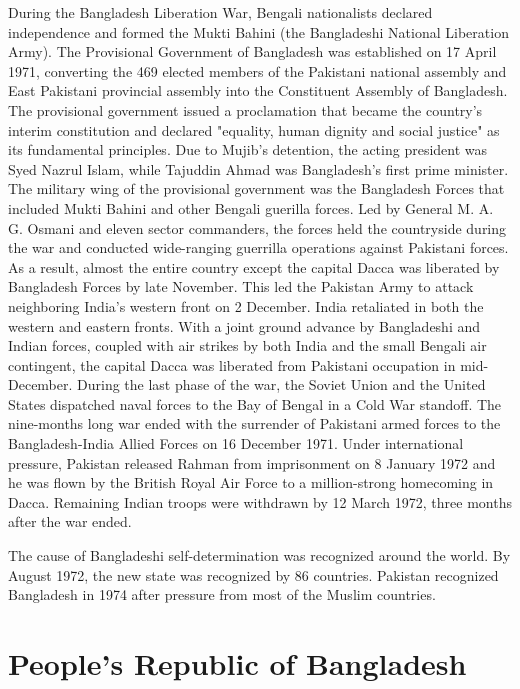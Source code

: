 During the Bangladesh Liberation War, Bengali nationalists declared
independence and formed the Mukti Bahini (the Bangladeshi National
Liberation Army). The Provisional Government of Bangladesh was
established on 17 April 1971, converting the 469 elected members of the
Pakistani national assembly and East Pakistani provincial assembly into
the Constituent Assembly of Bangladesh. The provisional government
issued a proclamation that became the country's interim constitution and
declared "equality, human dignity and social justice" as its fundamental
principles. Due to Mujib's detention, the acting president was Syed
Nazrul Islam, while Tajuddin Ahmad was Bangladesh's first prime
minister. The military wing of the provisional government was the
Bangladesh Forces that included Mukti Bahini and other Bengali guerilla
forces. Led by General M. A. G. Osmani and eleven sector commanders, the
forces held the countryside during the war and conducted wide-ranging
guerrilla operations against Pakistani forces. As a result, almost the
entire country except the capital Dacca was liberated by Bangladesh
Forces by late November. This led the Pakistan Army to attack
neighboring India's western front on 2 December. India retaliated in
both the western and eastern fronts. With a joint ground advance by
Bangladeshi and Indian forces, coupled with air strikes by both India
and the small Bengali air contingent, the capital Dacca was liberated
from Pakistani occupation in mid-December. During the last phase of the
war, the Soviet Union and the United States dispatched naval forces to
the Bay of Bengal in a Cold War standoff. The nine-months long war ended
with the surrender of Pakistani armed forces to the Bangladesh-India
Allied Forces on 16 December 1971. Under international pressure,
Pakistan released Rahman from imprisonment on 8 January 1972 and he was
flown by the British Royal Air Force to a million-strong homecoming in
Dacca. Remaining Indian troops were withdrawn by 12 March 1972, three
months after the war ended.

The cause of Bangladeshi self-determination was recognized around the
world. By August 1972, the new state was recognized by 86 countries.
Pakistan recognized Bangladesh in 1974 after pressure from most of the
Muslim countries.

\section{People's Republic of
Bangladesh}\label{peoples-republic-of-bangladesh}

